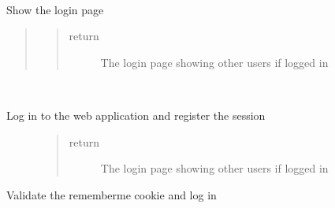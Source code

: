\documentclass[letterpaper,10pt,english]{sphinxmanual}
\begin{document}
\begin{fulllineitems}
\label{\detokenize{index:views.login.Login}}~

\begin{fulllineitems}
\label{\detokenize{index:views.login.Login.GET}}
Show the login page
\begin{quote}
\begin{quote}\begin{description}
\item[{return}] \leavevmode
The login page showing other users if logged in

\end{description}\end{quote}
\end{quote}

\end{fulllineitems}


\begin{fulllineitems}
\label{\detokenize{index:views.login.Login.POST}}~\begin{description}
\item[{Log in to the web application and register the session}] \leavevmode\begin{quote}\begin{description}
\item[{return}] \leavevmode
The login page showing other users if logged in

\end{description}\end{quote}

\end{description}

\end{fulllineitems}


\begin{fulllineitems}
\label{\detokenize{index:views.login.Login.check_rememberme}}
Validate the rememberme cookie and log in


\end{fulllineitems}
\end{fulllineitems}
\end{document}
